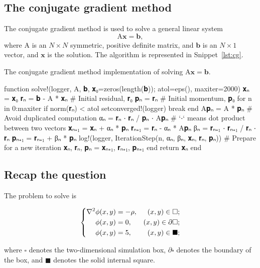 \subsection{The conjugate gradient method}

The conjugate gradient method is used to solve a general linear system
%
\begin{equation}
    \mathrm{A} \bm{x} = \bm{b},
\end{equation}
%
where \(\mathrm{A}\) is an \(N \times N\) symmetric, positive definite
matrix, and \(\bm{b}\) is an \(N \times 1\)
vector, and \(\bm{x}\) is the solution.
The algorithm is represented in Snippet~\ref{lst:cg}.

\begin{algorithm}
    \caption{The conjugate gradient method implementation of solving
        \(\mathrm{ A }\bm{ x } = \bm{ b }\).}
    \label{lst:cg}
    \begin{juliacode}
function solve!(logger, A, 𝐛, 𝐱₀=zeros(length(𝐛)); atol=eps(), maxiter=2000)
    𝐱ₙ = 𝐱₀
    𝐫ₙ = 𝐛 - A * 𝐱ₙ  # Initial residual, 𝐫₀
    𝐩ₙ = 𝐫ₙ  # Initial momentum, 𝐩₀
    for n in 0:maxiter
        if norm(𝐫ₙ) < atol
            setconverged!(logger)
            break
        end
        A𝐩ₙ = A * 𝐩ₙ  # Avoid duplicated computation
        αₙ = 𝐫ₙ ⋅ 𝐫ₙ / 𝐩ₙ ⋅ A𝐩ₙ  # `⋅` means dot product between two vectors
        𝐱ₙ₊₁ = 𝐱ₙ + αₙ * 𝐩ₙ
        𝐫ₙ₊₁ = 𝐫ₙ - αₙ * A𝐩ₙ
        βₙ = 𝐫ₙ₊₁ ⋅ 𝐫ₙ₊₁ / 𝐫ₙ ⋅ 𝐫ₙ
        𝐩ₙ₊₁ = 𝐫ₙ₊₁ + βₙ * 𝐩ₙ
        log!(logger, IterationStep(n, αₙ, βₙ, 𝐱ₙ, 𝐫ₙ, 𝐩ₙ))
        # Prepare for a new iteration
        𝐱ₙ, 𝐫ₙ, 𝐩ₙ = 𝐱ₙ₊₁, 𝐫ₙ₊₁, 𝐩ₙ₊₁
    end
    return 𝐱ₙ
end
    \end{juliacode}
\end{algorithm}


\subsection{Recap the question}

The problem to solve is
%
\begin{spreadlines}{2ex} %
    \begin{equation}
        \begin{dcases}
            \begin{aligned}
                \nabla^2 \phi(x, y) & = -\rho, & (x, y) \in \square;         \\
                \phi(x, y)          & = 0,     & (x, y) \in \partial\square; \\
                \phi(x, y)          & = 5,     & (x, y) \in \blacksquare;
            \end{aligned}
        \end{dcases}
    \end{equation}
\end{spreadlines}
%
where \(\square\) denotes the two-dimensional simulation box,
\(\partial\square\) denotes the boundary of the box,
and \(\blacksquare\) denotes the solid internal square.

